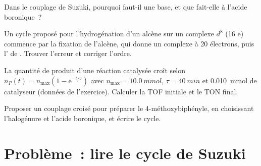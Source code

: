 \begin{exercise}[$\star\star$]\label{exo:b2:catalytic-cycles:9}
Dans le couplage de Suzuki, pourquoi faut-il une base, et que fait-elle à l'acide boronique~?
\end{exercise}

\begin{exercise}[$\star\star\star$]\label{exo:b2:catalytic-cycles:10}
Un cycle proposé pour l'hydrogénation d'un alcène sur un complexe $d^8$  (16 e)
commence par la fixation de l'alcène, qui donne un complexe à 20 électrons, puis l'
de . Trouver l'erreur et corriger l'ordre.
\end{exercise}

\begin{exercise}[$\star\star\star$]\label{exo:b2:catalytic-cycles:11}
La quantité de produit d'une réaction catalysée croît selon $n_P(t) = n_{\max}(1 - \mathrm e^{-t/\tau})$
avec $n_{\max} = \qty{10.0}{mmol}$, $\tau = \qty{40}{min}$ et \qty{0.010}{mmol} de catalyseur
(données de l'exercice). Calculer la TOF initiale et le TON final.
\end{exercise}

\begin{exercise}[$\star\star\star$]\label{exo:b2:catalytic-cycles:12}
Proposer un couplage croisé pour préparer le 4-méthoxybiphényle, en choisissant l'halogénure et l'acide
boronique, et écrire le cycle.
\end{exercise}

\section{Problème~: lire le cycle de Suzuki}

